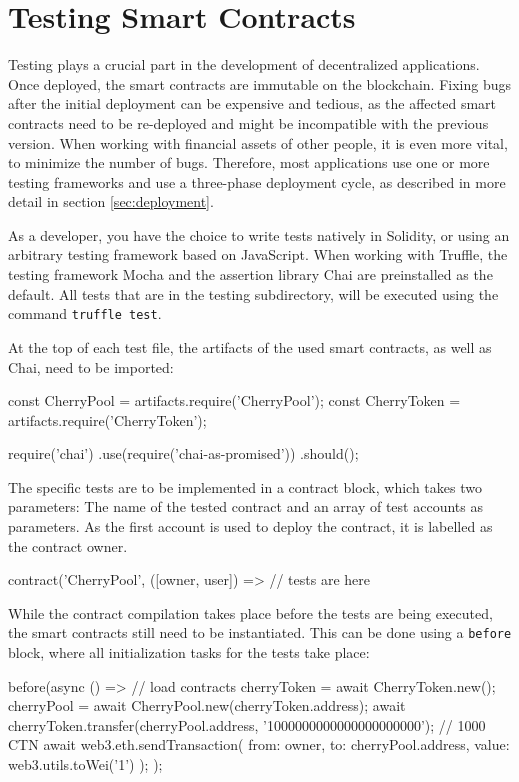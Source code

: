 \section{Testing Smart Contracts}
Testing plays a crucial part in the development of decentralized applications. Once deployed, the smart contracts are immutable on the blockchain. Fixing bugs after the initial deployment can be expensive and tedious, as the affected smart contracts need to be re-deployed and might be incompatible with the previous version. When working with financial assets of other people, it is even more vital, to minimize the number of bugs. Therefore, most applications use one or more testing frameworks and use a three-phase deployment cycle, as described in more detail in section \ref{sec:deployment}.

As a developer, you have the choice to write tests natively in Solidity, or using an arbitrary testing framework based on JavaScript. When working with Truffle, the testing framework Mocha\cite{Mocha} and the assertion library Chai\cite{Chai} are preinstalled as the default. All tests that are in the testing subdirectory, will be executed using the command \texttt{truffle test}.

At the top of each test file, the artifacts of the used smart contracts, as well as Chai, need to be imported:
\begin{GenericCode}
const CherryPool = artifacts.require('CherryPool');
const CherryToken = artifacts.require('CherryToken');

require('chai')
  .use(require('chai-as-promised'))
  .should();	
\end{GenericCode}

The specific tests are to be implemented in a contract block, which takes two parameters: The name of the tested contract and an array of test accounts as parameters. As the first account is used to deploy the contract, it is labelled as the contract owner.

\begin{GenericCode}
contract('CherryPool', ([owner, user]) => {
	// tests are here
}	
\end{GenericCode}

While the contract compilation takes place before the tests are being executed, the smart contracts still need to be instantiated. This can be done using a \texttt{before} block, where all initialization tasks for the tests take place:

\begin{GenericCode}
before(async () => {
  // load contracts
  cherryToken = await CherryToken.new();
  cherryPool = await CherryPool.new(cherryToken.address);
  await cherryToken.transfer(cherryPool.address, '1000000000000000000000'); // 1000 CTN
  await web3.eth.sendTransaction({ from: owner, to: cherryPool.address, value: web3.utils.toWei('1') });
});	
\end{GenericCode}

